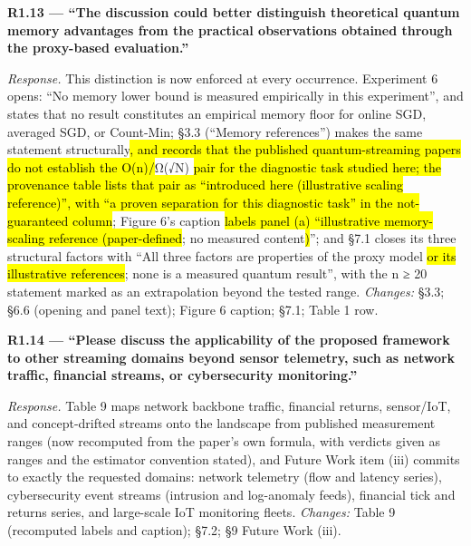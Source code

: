 \documentclass[
  11pt,
]{article}
\providecommand{\DIFadd}[1]{\hl{#1}} %
\providecommand{\DIFdel}[1]{} %
\providecommand{\DIFaddbegin}{} %
\providecommand{\DIFaddend}{} %
\providecommand{\DIFdelbegin}{} %
\providecommand{\DIFdelend}{} %
\providecommand{\DIFaddbegin}{}
\begin{document}
\textbf{R1.13 --- ``The discussion could better distinguish theoretical
quantum memory advantages from the practical observations obtained
through the proxy-based evaluation.''}

\emph{Response.} This distinction is now enforced at every occurrence.
Experiment 6 opens: ``No memory lower bound is measured empirically in
this experiment'', and states that no result constitutes an empirical
memory floor for online SGD, averaged SGD, or Count-Min; §3.3 (``Memory
references'') makes the same statement structurally\DIFdelbegin \DIFdel{; the provenance
table lists the }\DIFdelend \DIFaddbegin \DIFadd{, and records that
the published quantum-streaming papers do not establish the O(n)/}\DIFaddend Ω(√N)
\DIFdelbegin \DIFdel{curve as a ``conservative theoretical reference''
whose empirical-floor status is explicitly not guaranteed}\DIFdelend \DIFaddbegin \DIFadd{pair for the diagnostic task studied here; the provenance table lists
that pair as ``introduced here (illustrative scaling reference)'', with
``a proven separation for this diagnostic task'' in the not-guaranteed
column}\DIFaddend ; Figure 6's caption \DIFdelbegin \DIFdel{is labelled ``cited bounds}\DIFdelend \DIFaddbegin \DIFadd{labels panel (a) ``illustrative
memory-scaling reference (paper-defined}\DIFaddend ; no measured content\DIFaddbegin \DIFadd{)}\DIFaddend ''; and
§7.1 closes its three structural factors with ``All three factors are
properties of the proxy model \DIFdelbegin \DIFdel{and the cited theory}\DIFdelend \DIFaddbegin \DIFadd{or its illustrative references}\DIFaddend ; none is a
measured quantum result'', with the n ≥ 20 statement marked as an
extrapolation beyond the tested range. \emph{Changes:} §3.3; §6.6
(opening and panel text); Figure 6 caption; §7.1; Table 1 row.

\textbf{R1.14 --- ``Please discuss the applicability of the proposed
framework to other streaming domains beyond sensor telemetry, such as
network traffic, financial streams, or cybersecurity monitoring.''}

\emph{Response.} Table 9 maps network backbone traffic, financial
returns, sensor/IoT, and concept-drifted streams onto the landscape from
published measurement ranges (now recomputed from the paper's own
formula, with verdicts given as ranges and the estimator convention
stated), and Future Work item (iii) commits to exactly the requested
domains: network telemetry (flow and latency series), cybersecurity
event streams (intrusion and log-anomaly feeds), financial tick and
returns series, and large-scale IoT monitoring fleets. \emph{Changes:}
Table 9 (recomputed labels and caption); §7.2; §9 Future Work (iii).
\end{document}

